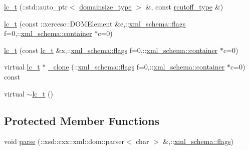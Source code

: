 \begin{DoxyCompactItemize}
\item 
\hyperlink{classlc__t_a3b7b9d1fa28656ded4069a0177bf1297}{lc\-\_\-t} (\-::std\-::auto\-\_\-ptr$<$ \hyperlink{classlc__t_a14e4ab30758da00bc9f186b0ef06a97e}{domainsize\-\_\-type} $>$ \&, const \hyperlink{classlc__t_aeee50e2ac6fe42996cb39a92ad78883e}{rcutoff\-\_\-type} \&)
\item 
\hyperlink{classlc__t_afc944263c2450efa255b3b5669e62ba6}{lc\-\_\-t} (const \-::xercesc\-::\-D\-O\-M\-Element \&e,\-::\hyperlink{namespacexml__schema_a0612287d030cb2732d31a45b258fdc87}{xml\-\_\-schema\-::flags} f=0,\-::\hyperlink{namespacexml__schema_ada9aa30dc722e93ee2ed7243085402a5}{xml\-\_\-schema\-::container} $\ast$c=0)
\item 
\hyperlink{classlc__t_a87e7f3976afb8500ec97e69edd7cfac5}{lc\-\_\-t} (const \hyperlink{classlc__t}{lc\-\_\-t} \&x,\-::\hyperlink{namespacexml__schema_a0612287d030cb2732d31a45b258fdc87}{xml\-\_\-schema\-::flags} f=0,\-::\hyperlink{namespacexml__schema_ada9aa30dc722e93ee2ed7243085402a5}{xml\-\_\-schema\-::container} $\ast$c=0)
\item 
virtual \hyperlink{classlc__t}{lc\-\_\-t} $\ast$ \hyperlink{classlc__t_af8d3a68bf8d7ba42ef03c24439bbfb63}{\-\_\-clone} (\-::\hyperlink{namespacexml__schema_a0612287d030cb2732d31a45b258fdc87}{xml\-\_\-schema\-::flags} f=0,\-::\hyperlink{namespacexml__schema_ada9aa30dc722e93ee2ed7243085402a5}{xml\-\_\-schema\-::container} $\ast$c=0) const 
\item 
virtual \hyperlink{classlc__t_a40d77173a6b92f269bc4445453919fc1}{$\sim$lc\-\_\-t} ()
\end{DoxyCompactItemize}
\subsection*{Protected Member Functions}
\begin{DoxyCompactItemize}
\item 
void \hyperlink{classlc__t_a805dd25d448f39324c1b262930fe15d2}{parse} (\-::xsd\-::cxx\-::xml\-::dom\-::parser$<$ char $>$ \&,\-::\hyperlink{namespacexml__schema_a0612287d030cb2732d31a45b258fdc87}{xml\-\_\-schema\-::flags})
\end{DoxyCompactItemize}
